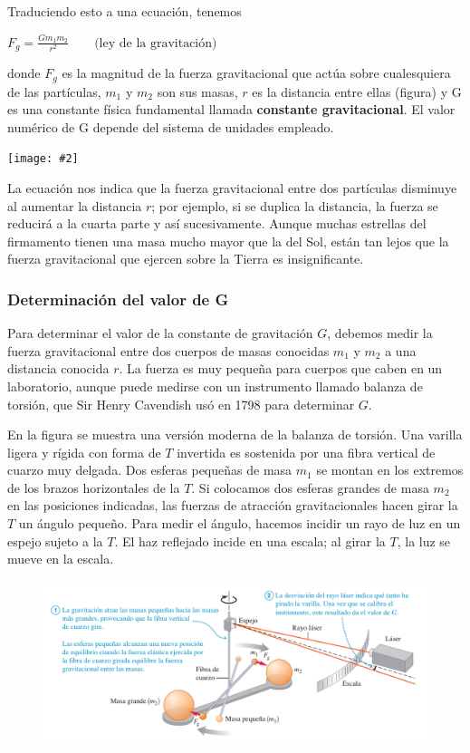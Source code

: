\documentclass{article}
\newcommand{\newtitle}[1]{
    \color{titleColor}
    \subsubsection{#1}
    \color{black}
}
\newcommand{\bl}[1]{\textbf{#1}}
\newcommand{\definicion}[1]{%
    \vspace{0.5cm}
    \begin{definicionbox}
        #1
    \end{definicionbox}
    \vspace{0.5cm}
}
\newcommand{\ladoALado}[4]{
    \begin{minipage}[t]{#3\textwidth}
        \vspace{0pt}
        #1
    \end{minipage}
    \hfill
    \begin{minipage}[t]{#4\textwidth}
        \vspace{0pt}
        \centering
        \texttt{[image: \#2]}
    \end{minipage}
}
\begin{document}
    \par Traduciendo esto a una ecuación, tenemos

    \definicion{
        \centering
        \( F_g = \frac{G m_1 m_2}{r^2} \quad \quad \text{(ley de la gravitación)} \)
    }

    \ladoALado{
        \noindent donde $F_g$ es la magnitud de la fuerza gravitacional que actúa sobre cualesquiera de las partículas, $m_1$ y $m_2$ son sus masas, $r$ es la distancia entre ellas (ﬁgura) y G es una constante física fundamental llamada \bl{constante gravitacional}. El valor numérico de G depende del sistema de unidades empleado.
    }{img/11.1-1.png}{0.5}{0.5}

    \par La ecuación nos indica que la fuerza gravitacional entre dos partículas disminuye al aumentar la distancia $r$; por ejemplo, si se duplica la distancia, la fuerza se reducirá a la cuarta parte y así sucesivamente. Aunque muchas estrellas del ﬁrmamento tienen una masa mucho mayor que la del Sol, están tan lejos que la fuerza gravitacional que ejercen sobre la Tierra es insigniﬁcante.

    \newtitle{Determinación del valor de G}

    \par Para determinar el valor de la constante de gravitación $G$, debemos medir la fuerza gravitacional entre dos cuerpos de masas conocidas $m_1$ y $m_2$ a una distancia conocida $r$. La fuerza es muy pequeña para cuerpos que caben en un laboratorio, aunque puede medirse con un instrumento llamado balanza de torsión, que Sir Henry Cavendish usó en 1798 para determinar $G$.
    
    \par En la ﬁgura se muestra una versión moderna de la balanza de torsión. Una varilla ligera y rígida con forma de $T$ invertida es sostenida por una ﬁbra vertical de cuarzo muy delgada. Dos esferas pequeñas de masa $m_1$ se montan en los extremos de los brazos horizontales de la $T$. Si colocamos dos esferas grandes de masa $m_2$ en las posiciones indicadas, las fuerzas de atracción gravitacionales hacen girar la $T$ un ángulo pequeño. Para medir el ángulo, hacemos incidir un rayo de luz en un espejo sujeto a la $T$. El haz reﬂejado incide en una escala; al girar la $T$, la luz se mueve en la escala.

    \begin{figure}[H]
        \centering
        \includegraphics[width=\textwidth]{img/11.1-2.png}
    \end{figure}
\end{document}
